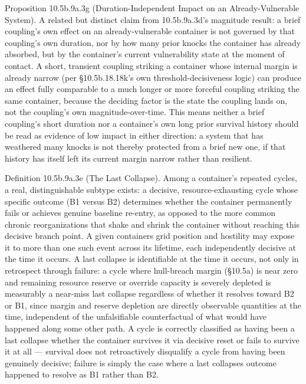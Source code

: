 \documentclass[
]{article}
\begin{document}
Proposition 10.5b.9a.3g (Duration-Independent Impact on an
Already-Vulnerable System). A related but distinct claim from
10.5b.9a.3d's magnitude result: a brief coupling's own effect on an
already-vulnerable container is not governed by that coupling's own
duration, nor by how many prior knocks the container has already
absorbed, but by the container's current vulnerability state at the
moment of contact. A short, transient coupling striking a container
whose internal margin is already narrow (per §10.5b.18.18k's own
threshold-decisiveness logic) can produce an effect fully comparable to
a much longer or more forceful coupling striking the same container,
because the deciding factor is the state the coupling lands on, not the
coupling's own magnitude-over-time. This means neither a brief
coupling's short duration nor a container's own long prior survival
history should be read as evidence of low impact in either direction: a
system that has weathered many knocks is not thereby protected from a
brief new one, if that history has itself left its current margin narrow
rather than resilient.

Definition 10.5b.9a.3e (The Last Collapse). Among a container's repeated
cycles, a real, distinguishable subtype exists: a decisive,
resource-exhausting cycle whose specific outcome (B1 versus B2)
determines whether the container permanently fails or achieves genuine
baseline re-entry, as opposed to the more common chronic reorganizations
that shake and shrink the container without reaching this decisive
branch point. A given containers grid position and hostility may expose
it to more than one such event across its lifetime, each independently
decisive at the time it occurs. A last collapse is identifiable at the
time it occurs, not only in retrospect through failure: a cycle where
hull-breach margin (§10.5a) is near zero and remaining resource reserve
or override capacity is severely depleted is measurably a near-miss last
collapse regardless of whether it resolves toward B2 or B1, since margin
and reserve depletion are directly observable quantities at the time,
independent of the unfalsifiable counterfactual of what would have
happened along some other path. A cycle is correctly classified as
having been a last collapse whether the container survives it via
decisive reset or fails to survive it at all --- survival does not
retroactively disqualify a cycle from having been genuinely decisive;
failure is simply the case where a last collapses outcome happened to
resolve as B1 rather than B2.
\end{document}
